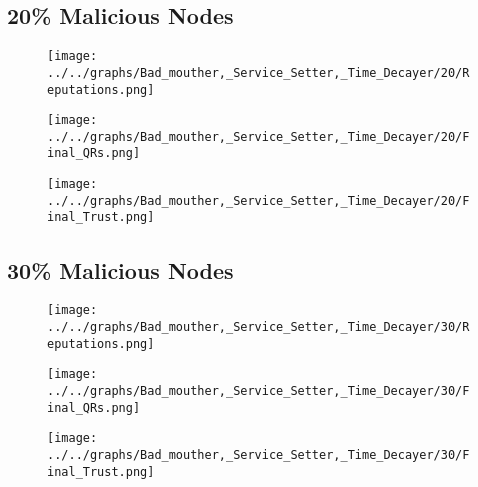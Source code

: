 \begin{minipage}[t]{0.49\columnwidth}
\subsection*{20\% Malicious Nodes}
    \begin{figure}[H]
        \centering
        \texttt{[image: ../../graphs/Bad\_mouther,\_Service\_Setter,\_Time\_Decayer/20/Reputations.png]}
    \end{figure}
    \begin{figure}[H]
        \centering
        \texttt{[image: ../../graphs/Bad\_mouther,\_Service\_Setter,\_Time\_Decayer/20/Final\_QRs.png]}
    \end{figure}
\end{minipage}
\begin{minipage}[t]{0.49\columnwidth}
    \begin{figure}[H]
        \centering
        \texttt{[image: ../../graphs/Bad\_mouther,\_Service\_Setter,\_Time\_Decayer/20/Final\_Trust.png]}
    \end{figure}
\end{minipage}

\begin{minipage}[t]{0.49\columnwidth}
\subsection*{30\% Malicious Nodes}
    \begin{figure}[H]
        \centering
        \texttt{[image: ../../graphs/Bad\_mouther,\_Service\_Setter,\_Time\_Decayer/30/Reputations.png]}
    \end{figure}
    \begin{figure}[H]
        \centering
        \texttt{[image: ../../graphs/Bad\_mouther,\_Service\_Setter,\_Time\_Decayer/30/Final\_QRs.png]}
    \end{figure}
\end{minipage}
\begin{minipage}[t]{0.49\columnwidth}
    \begin{figure}[H]
        \centering
        \texttt{[image: ../../graphs/Bad\_mouther,\_Service\_Setter,\_Time\_Decayer/30/Final\_Trust.png]}
    \end{figure}
\end{minipage}

